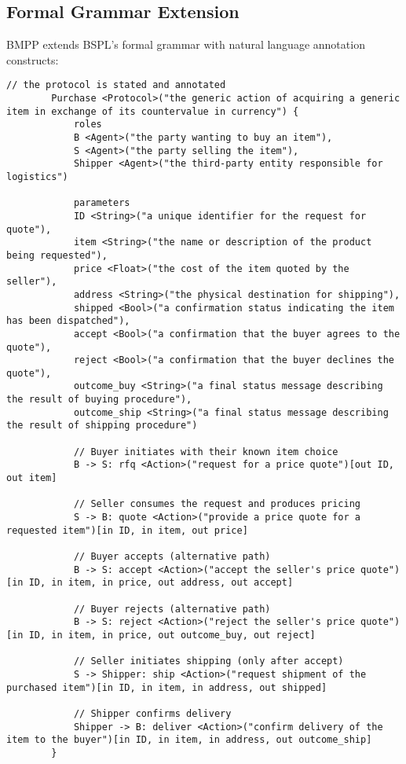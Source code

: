\documentclass[11pt,a4paper]{article}
\begin{document}
	\subsection{Formal Grammar Extension}
	\label{subsec:grammar}
	
	BMPP extends BSPL's formal grammar with natural language annotation constructs:
	
	\begin{lstlisting}[caption={A more complex example of BMPP complete protocol},label=lst:complex-bmpp]
		// the protocol is stated and annotated
		Purchase <Protocol>("the generic action of acquiring a generic item in exchange of its countervalue in currency") {
			roles
			B <Agent>("the party wanting to buy an item"),
			S <Agent>("the party selling the item"),
			Shipper <Agent>("the third-party entity responsible for logistics")
			
			parameters
			ID <String>("a unique identifier for the request for quote"),
			item <String>("the name or description of the product being requested"),
			price <Float>("the cost of the item quoted by the seller"),
			address <String>("the physical destination for shipping"),
			shipped <Bool>("a confirmation status indicating the item has been dispatched"),
			accept <Bool>("a confirmation that the buyer agrees to the quote"),  
			reject <Bool>("a confirmation that the buyer declines the quote"),
			outcome_buy <String>("a final status message describing the result of buying procedure"),
			outcome_ship <String>("a final status message describing the result of shipping procedure")
			
			// Buyer initiates with their known item choice
			B -> S: rfq <Action>("request for a price quote")[out ID, out item]
			
			// Seller consumes the request and produces pricing
			S -> B: quote <Action>("provide a price quote for a requested item")[in ID, in item, out price]
			
			// Buyer accepts (alternative path)
			B -> S: accept <Action>("accept the seller's price quote")[in ID, in item, in price, out address, out accept]
			
			// Buyer rejects (alternative path)
			B -> S: reject <Action>("reject the seller's price quote")[in ID, in item, in price, out outcome_buy, out reject]
			
			// Seller initiates shipping (only after accept)
			S -> Shipper: ship <Action>("request shipment of the purchased item")[in ID, in item, in address, out shipped]
			
			// Shipper confirms delivery
			Shipper -> B: deliver <Action>("confirm delivery of the item to the buyer")[in ID, in item, in address, out outcome_ship]
		}
	\end{lstlisting}
	
\end{document}
